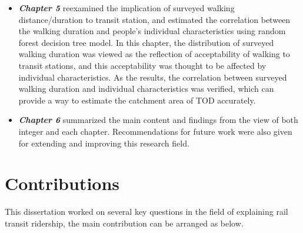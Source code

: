 \begin{itemize}
	\item \emph{\textbf{Chapter 5}} reexamined the implication of surveyed walking distance/duration to transit station, and estimated the correlation between the walking duration and people's individual characteristics using random forest decision tree model. In this chapter, the distribution of surveyed walking duration was viewed as the reflection of acceptability of walking to transit stations, and this acceptability was thought to be affected by individual characteristics. As the results, the correlation between surveyed walking duration and individual characteristics was verified, which can provide a way to estimate the catchment area of TOD accurately.
	
	\item \emph{\textbf{Chapter 6}} summarized the main content and findings from the view of both integer and each chapter. Recommendations for future work were also given for extending and improving this research field.
\end{itemize}

\section{Contributions}

This dissertation worked on several key questions in the field of explaining rail transit ridership, the main contribution can be arranged as below.

